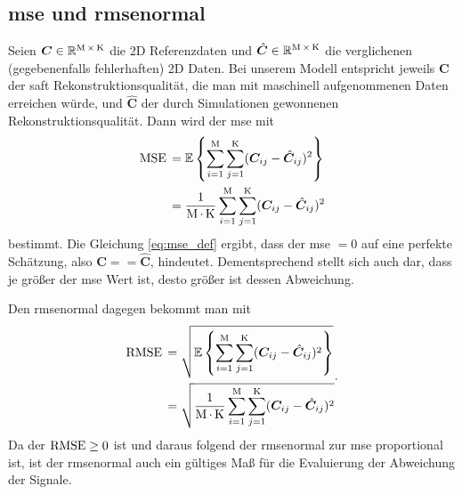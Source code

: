 \subsection*{\acrshort{mse} und \acrshort{rmsenormal}}
Seien $\bm{C} \in {\mathbb{R}}^{\operatorname{M} \times \operatorname{K}}$ die 2D Referenzdaten und $\hat{\bm{C}} \in {\mathbb{R}}^{\operatorname{M} \times \operatorname{K}}$ die verglichenen (gegebenenfalls fehlerhaften) 2D Daten. Bei unserem Modell entspricht jeweils $\bm{C}$ der \acrshort{saft} Rekonstruktionsqualität, die man mit maschinell aufgenommenen Daten erreichen würde, und $\hat{\bm{C}}$ der durch Simulationen gewonnenen Rekonstruktionsqualität. Dann wird der \acrshort{mse} mit 
\begin{equation} \label{eq:mse_def}
\begin{aligned}
\operatorname{MSE} {} & = \operatorname{{{\mathbb E}}} \left \{ \sum_{i=1}^{\operatorname{M}} \sum_{j=1}^{\operatorname{K}} (\bm{C}_{ij} - \hat{\bm{C}}_{ij})^2 \right \}  \\
& = \frac{1}{\operatorname{M} \cdot \operatorname{K}} \sum_{i=1}^{\operatorname{M}} \sum_{j=1}^{\operatorname{K}} (\bm{C}_{ij} - \hat{\bm{C}}_{ij})^2
\end{aligned}
\end{equation}
bestimmt. Die Gleichung \ref{eq:mse_def} ergibt, dass der \acrshort{mse} $= 0$ auf eine perfekte Schätzung, also $\bm{C} == \hat{\bm{C}}$, hindeutet. Dementsprechend stellt sich auch dar, dass je größer der \acrshort{mse} Wert ist, desto größer ist dessen Abweichung. \par
Den \acrshort{rmsenormal} dagegen bekommt man mit 
\begin{equation} \label{eq:rmse_def}
\begin{aligned}
\operatorname{RMSE} {} & =    \sqrt{ \operatorname{{{\mathbb E}}} \left \{ \sum_{i=1}^{\operatorname{M}} \sum_{j=1}^{\operatorname{K}} (\bm{C}_{ij} - \hat{\bm{C}}_{ij})^2 \right \} } \\
& = \sqrt{ \frac{1}{\operatorname{M} \cdot \operatorname{K}} \sum_{i=1}^{\operatorname{M}} \sum_{j=1}^{\operatorname{K}} (\bm{C}_{ij} - \hat{\bm{C}}_{ij})^2 }
\end{aligned}  .
\end{equation}
Da der $\operatorname{RMSE} \geq 0$ ist und daraus folgend der \acrshort{rmsenormal} zur \acrshort{mse} proportional ist, ist der \acrshort{rmsenormal} auch ein gültiges Maß für die Evaluierung der Abweichung der Signale. 

